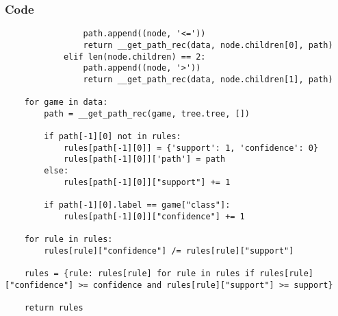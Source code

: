 \documentclass{beamer}
\begin{document}
\begin{frame}[t, fragile]
    \frametitle{Code}
    \fontsize{3pt}{5pt}\selectfont
    \begin{verbatim}
                path.append((node, '<='))
                return __get_path_rec(data, node.children[0], path)
            elif len(node.children) == 2:
                path.append((node, '>'))
                return __get_path_rec(data, node.children[1], path)

    for game in data:
        path = __get_path_rec(game, tree.tree, [])
        
        if path[-1][0] not in rules:
            rules[path[-1][0]] = {'support': 1, 'confidence': 0}
            rules[path[-1][0]]['path'] = path
        else:
            rules[path[-1][0]]["support"] += 1

        if path[-1][0].label == game["class"]:
            rules[path[-1][0]]["confidence"] += 1

    for rule in rules:
        rules[rule]["confidence"] /= rules[rule]["support"]

    rules = {rule: rules[rule] for rule in rules if rules[rule]["confidence"] >= confidence and rules[rule]["support"] >= support}

    return rules
    \end{verbatim}
\end{frame}

\end{document}
